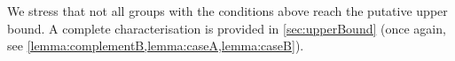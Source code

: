 \documentclass[a4paper]{amsart}
\newcommand{\primozcomment}[1]{\textcolor{magenta}{{\textbf{Primoz:} #1}}}
\newcommand{\Sym}{\mathrm{Sym}}
\newcommand{\Alt}{\mathrm{Alt}}
\renewcommand{\wr}{\mathop{\mathrm{wr}}}
\newcommand{\mix}{\mathop{\mathrm{mix}}}
\newcommand{\A}{\mathsf{A}}
\newtheorem{theorem}{Theorem}[]
\theoremstyle{definition}
\begin{document}

We stress that not all groups with the conditions above reach the putative upper bound. A complete characterisation is provided in \cref{sec:upperBound} (once again, see \cref{lemma:complementB,lemma:caseA,lemma:caseB}).
\end{document}
